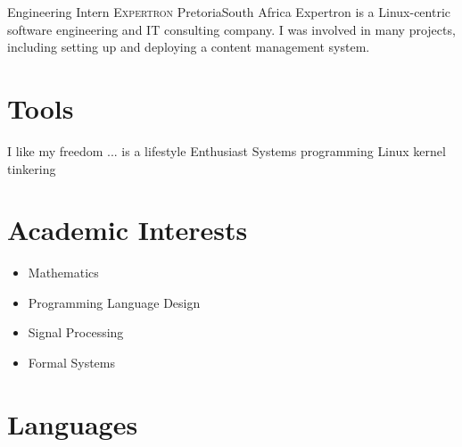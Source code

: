 \documentclass[10pt,a4paper,sans]{moderncv}
\begin{document}
{Engineering Intern}
{\textsc{Expertron}}
{\newline Pretoria}{South Africa}
{Expertron is a Linux-centric software engineering and IT consulting company. I
was involved in many projects, including setting up and deploying a content
management system.}


\section{Tools}

{{\normalfont I like my freedom}}
{}
{{\normalfont ... is a lifestyle}}
{}
{{\normalfont Enthusiast}}
{}
{{\normalfont Systems programming}}
{}
{{\normalfont Linux kernel tinkering}}
{}


\section{Academic Interests}
\begin{itemize}
	\item Mathematics
	\item Programming Language Design
	\item Signal Processing
	\item Formal Systems
\end{itemize}


\section{Languages}
\end{document}
